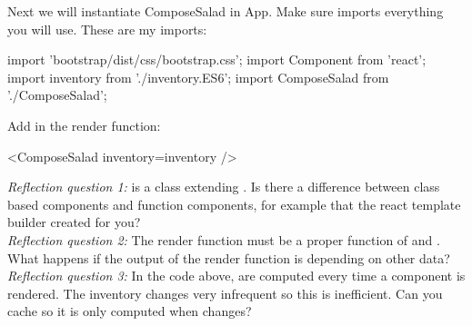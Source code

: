\documentclass[fleqn, article, a4paper]{memoir}
\begin{document}
\begin{Assignments}
\noindent Next we will instantiate ComposeSalad in App. Make sure  imports everything you will use. These are my imports:
\begin{Code}
import 'bootstrap/dist/css/bootstrap.css';
import { Component } from 'react';
import inventory from './inventory.ES6';
import ComposeSalad from './ComposeSalad';
\end{Code}

Add  in the render function:
\begin{Code}
<ComposeSalad inventory={inventory} />
\end{Code}

\noindent \emph{Reflection question 1:}  is a class extending . Is there a difference between class based components and function components, for example  that the react template builder created for you?
\\\emph{Reflection question 2:} The render function must be a proper function of  and . What happens if the output of the render function is depending on other data?
\\\emph{Reflection question 3:} In the code above,  are computed every time a component is rendered. The inventory changes very infrequent so this is inefficient. Can you cache  so it is only computed when  changes?


\end{Assignments}
\end{document}
